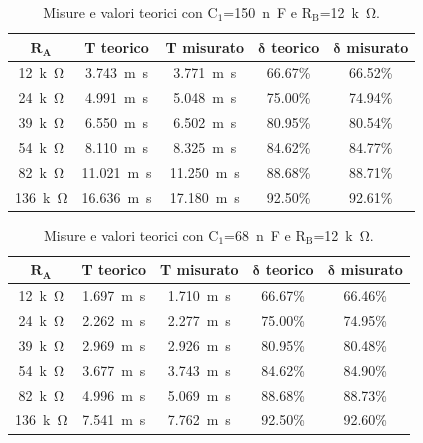\documentclass{report}
\begin{document}
\begin{table}[h!]
	\centering
	\begin{tabular}{|c|c|c|c|c|}
		\hline
		$\mathbf{R_A}$ & \textbf{T teorico} & \textbf{T misurato} & $\mathbf\delta$\textbf{ teorico} & $\mathbf\delta$\textbf{ misurato}\\ 
		\hline
		\SI{12}{k\ohm} & \SI{3.743}{m\second} & \SI{3.771}{m\second} & 66.67\% & 66.52\% \\ 
		\hline
		\SI{24}{k\ohm} & \SI{4.991}{m\second} & \SI{5.048}{m\second} & 75.00\% & 74.94\% \\ 
		\hline
		\SI{39}{k\ohm} & \SI{6.550}{m\second} & \SI{6.502}{m\second} & 80.95\% & 80.54\% \\ 
		\hline
		\SI{54}{k\ohm} & \SI{8.110}{m\second} & \SI{8.325}{m\second} & 84.62\% & 84.77\% \\ 
		\hline
		\SI{82}{k\ohm} & \SI{11.021}{m\second} & \SI{11.250}{m\second} & 88.68\% & 88.71\% \\ 
		\hline
		\SI{136}{k\ohm} & \SI{16.636}{m\second} & \SI{17.180}{m\second} &  92.50\% & 92.61\% \\ 
		\hline
	\end{tabular}
	\caption{Misure e valori teorici con $\mathrm{C_1}$=\SI{150}{n\farad} e $\mathrm{R_B}$=\SI{12}{k\ohm}.}
	\label{table:mis_cto3_1}
\end{table}
\begin{table}[h!]
	\centering
	\begin{tabular}{|c|c|c|c|c|}
		\hline
		$\mathbf{R_A}$ & \textbf{T teorico} & \textbf{T misurato} & $\mathbf\delta$\textbf{ teorico} & $\mathbf\delta$\textbf{ misurato}\\ 
		\hline
		\SI{12}{k\ohm} & \SI{1.697}{m\second} & \SI{1.710}{m\second} & 66.67\% & 66.46\% \\ 
		\hline
		\SI{24}{k\ohm} & \SI{2.262}{m\second} & \SI{2.277}{m\second} & 75.00\% & 74.95\% \\ 
		\hline
		\SI{39}{k\ohm} & \SI{2.969}{m\second} & \SI{2.926}{m\second} & 80.95\% & 80.48\% \\ 
		\hline
		\SI{54}{k\ohm} & \SI{3.677}{m\second} & \SI{3.743}{m\second} & 84.62\% & 84.90\% \\ 
		\hline
		\SI{82}{k\ohm} & \SI{4.996}{m\second} & \SI{5.069}{m\second} & 88.68\% & 88.73\% \\ 
		\hline
		\SI{136}{k\ohm} & \SI{7.541}{m\second} & \SI{7.762}{m\second} & 92.50\% & 92.60\% \\ 
		\hline
	\end{tabular}
	\caption{Misure e valori teorici con $\mathrm{C_1}$=\SI{68}{n\farad} e $\mathrm{R_B}$=\SI{12}{k\ohm}.}
	\label{table:mis_cto3_2}
\end{table}
\end{document}
